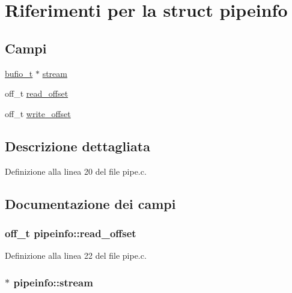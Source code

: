 \hypertarget{structpipeinfo}{\section{Riferimenti per la struct pipeinfo}
\label{structpipeinfo}
}
\subsection*{Campi}
\begin{DoxyCompactItemize}
\item 
\hyperlink{bufio_8h_aed33c7684664724ce2d39fe264246e35}{bufio\+\_\+t} $\ast$ \hyperlink{structpipeinfo_add2e1b264654f589da8c98cd502c3fbc}{stream}
\item 
off\+\_\+t \hyperlink{structpipeinfo_a88940cfea171abbf28b2b96bc87054ca}{read\+\_\+offset}
\item 
off\+\_\+t \hyperlink{structpipeinfo_abb510c9ed7b4d0bc60432bcc04e3962b}{write\+\_\+offset}
\end{DoxyCompactItemize}


\subsection{Descrizione dettagliata}


Definizione alla linea 20 del file pipe.\+c.



\subsection{Documentazione dei campi}
\hypertarget{structpipeinfo_a88940cfea171abbf28b2b96bc87054ca}{
\subsubsection[{read\+\_\+offset}]{\setlength{\rightskip}{0pt plus 5cm}off\+\_\+t pipeinfo\+::read\+\_\+offset}}\label{structpipeinfo_a88940cfea171abbf28b2b96bc87054ca}


Definizione alla linea 22 del file pipe.\+c.

\hypertarget{structpipeinfo_add2e1b264654f589da8c98cd502c3fbc}{
\subsubsection[{stream}]{$\ast$ pipeinfo\+::stream}}\label{structpipeinfo_add2e1b264654f589da8c98cd502c3fbc}


